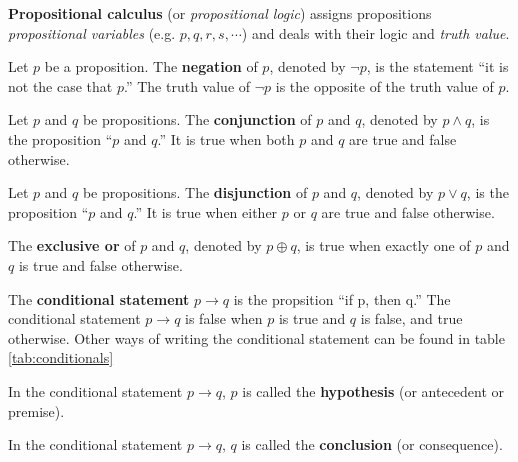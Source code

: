 \begin{defn}
  \textbf{Propositional calculus} (or \emph{propositional logic}) assigns propositions \emph{propositional variables}
  (e.g. \(p, q, r, s, \cdots\)) and deals with their logic and \emph{truth value}.
\end{defn}
\begin{defn}
  Let \(p\) be a proposition. The \textbf{negation} of \(p\), denoted by \(\neg p\), is the statement
  ``it is not the case that \(p\).''
  The truth value of \(\neg p\) is the opposite of the truth value of \(p\).
\end{defn}
\begin{defn}
  Let \(p\) and \(q\) be propositions. The \textbf{conjunction} of \(p\) and \(q\), denoted by \( p \wedge q \), is the proposition
  ``\(p\) and \(q\).'' It is true when both \(p\) and \(q\) are true and false otherwise.
\end{defn}
\begin{defn}
  Let \(p\) and \(q\) be propositions. The \textbf{disjunction} of \(p\) and \(q\), denoted by \( p \vee q \), is the proposition
  ``\(p\) and \(q\).'' It is true when either \(p\) or \(q\) are true and false otherwise.
\end{defn}
\begin{defn}
  The \textbf{exclusive or} of \(p\) and \(q\), denoted by \(p \oplus q\), is true when exactly one of \(p\) and \(q\) is true and false otherwise.
\end{defn}
\begin{defn}
  The \textbf{conditional statement} \(p \to q\) is the propsition ``if p, then q.''
  The conditional statement \(p \to q\) is false when \(p\) is true and \(q\) is false, and true otherwise.
  Other ways of writing the conditional statement can be found in table \ref{tab:conditionals}
\end{defn}
\begin{defn} 
  In the conditional statement \(p \to q\), \(p\) is called the \textbf{hypothesis} (or antecedent or premise).
\end{defn}
\begin{defn} 
  In the conditional statement \(p \to q\), \(q\) is called the \textbf{conclusion} (or consequence).
\end{defn}
